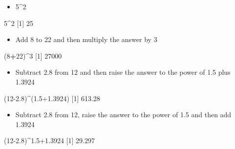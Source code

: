\documentclass[
]{book}
\newenvironment{Shaded}{\begin{snugshade}}{\end{snugshade}}
\newcommand{\DecValTok}[1]{\textcolor[rgb]{0.00,0.00,0.81}{#1}}
\newcommand{\FloatTok}[1]{\textcolor[rgb]{0.00,0.00,0.81}{#1}}
\newcommand{\NormalTok}[1]{#1}
\newcommand{\OperatorTok}[1]{\textcolor[rgb]{0.81,0.36,0.00}{\textbf{#1}}}
\providecommand{\tightlist}{%
  \setlength{\itemsep}{0pt}\setlength{\parskip}{0pt}}
\begin{document}
\begin{itemize}
\tightlist
\item
  5\^{}2
\end{itemize}

\begin{Shaded}
\begin{Highlighting}[]
\DecValTok{5}\OperatorTok{^}\DecValTok{2}   
\NormalTok{[}\DecValTok{1}\NormalTok{] }\DecValTok{25}
\end{Highlighting}
\end{Shaded}

\begin{itemize}
\tightlist
\item
  Add 8 to 22 and then multiply the answer by 3
\end{itemize}

\begin{Shaded}
\begin{Highlighting}[]
\NormalTok{(}\DecValTok{8}\OperatorTok{+}\DecValTok{22}\NormalTok{)}\OperatorTok{^}\DecValTok{3}
\NormalTok{[}\DecValTok{1}\NormalTok{] }\DecValTok{27000}
\end{Highlighting}
\end{Shaded}

\begin{itemize}
\tightlist
\item
  Subtract 2.8 from 12 and then raise the answer to the power of 1.5 plus 1.3924
\end{itemize}

\begin{Shaded}
\begin{Highlighting}[]
\NormalTok{(}\DecValTok{12}\FloatTok{-2.8}\NormalTok{)}\OperatorTok{^}\NormalTok{(}\FloatTok{1.5+1.3924}\NormalTok{)}
\NormalTok{[}\DecValTok{1}\NormalTok{] }\FloatTok{613.28}
\end{Highlighting}
\end{Shaded}

\begin{itemize}
\tightlist
\item
  Subtract 2.8 from 12, raise the answer to the power of 1.5 and then add 1.3924
\end{itemize}

\begin{Shaded}
\begin{Highlighting}[]
\NormalTok{(}\DecValTok{12}\FloatTok{-2.8}\NormalTok{)}\OperatorTok{^}\FloatTok{1.5+1.3924}
\NormalTok{[}\DecValTok{1}\NormalTok{] }\FloatTok{29.297}
\end{Highlighting}
\end{Shaded}
\end{document}
